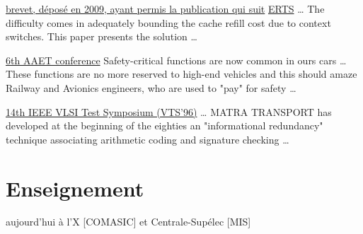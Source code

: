 \documentclass[12pt,a4paper]{moderncv}
\begin{document}
{\href{https://bases-brevets.inpi.fr/fr/document/FR2956913.html}{brevet, déposé en 2009, ayant permis la publication qui suit}}{}{}{}
{\href{https://web1.see.asso.fr/erts2010/Site/0ANDGY78/Fichier/PAPIERS ERTS 2010 2/ERTS2010_0119_final.pdf}{ERTS}}{}{}{
\ldots
The difficulty comes in adequately bounding the cache refill cost due to context switches. This paper presents the solution
\ldots
}

{\href{http://download.faszination-leichtbau.de/Proceedings_Volume_II_AAET2005.pdf}{6th AAET conference}}{}{}{
Safety-critical functions are now common in ours cars \ldots
These functions are no more reserved to high-end vehicles and this should amaze Railway and Avionics engineers, who are used to "pay" for safety \ldots
}

{\href{https://jeanlouisdufour.github.io/96_VTS.pdf}{14th IEEE VLSI Test Symposium (VTS'96)}}{}{}{
\ldots
MATRA TRANSPORT has developed at the beginning of the eighties an "informational redundancy" technique associating arithmetic coding and signature checking
\ldots
}



\section{Enseignement}

{}{}{}{
aujourd'hui à l'X [COMASIC] et Centrale-Supélec [MIS]
}





\end{document}
